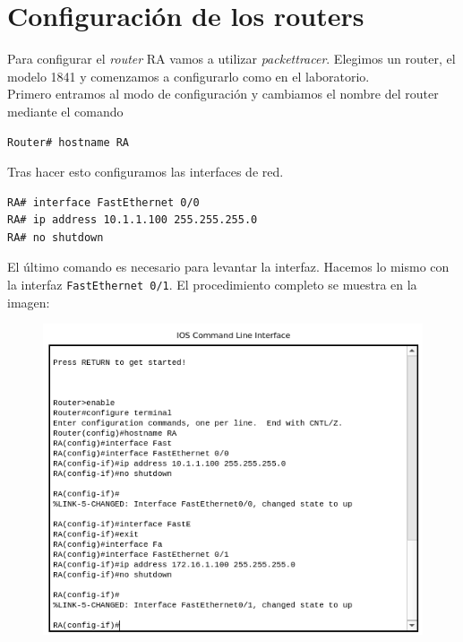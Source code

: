 \documentclass[11pt,a4paper]{article}
\begin{document}
\newpage

\section{Configuración de los routers}

Para configurar el \textit{router} RA vamos a utilizar \textit{packettracer}. Elegimos un router, el modelo 1841 y comenzamos a configurarlo como en el laboratorio.\\

Primero entramos al modo de configuración y cambiamos el nombre del router mediante el comando\\

\begin{lstlisting}[language=bash,caption={Cambio de hostname},captionpos=b]
Router# hostname RA
\end{lstlisting}

Tras hacer esto configuramos las interfaces de red.\\

\begin{lstlisting}[language=bash,caption={Configuración de la interfaz FastEthernet 0/0},captionpos=b]
RA# interface FastEthernet 0/0
RA# ip address 10.1.1.100 255.255.255.0
RA# no shutdown
\end{lstlisting}

El último comando es necesario para levantar la interfaz. Hacemos lo mismo con la interfaz \texttt{FastEthernet 0/1}. El procedimiento completo se muestra en la imagen:

\begin{figure}[H]
	\centering
	\includegraphics[scale=0.7]{img/RA-config.png}
\end{figure}
\end{document}
